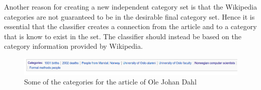 Another reason for creating a new independent category set is that the Wikipedia categories are not guaranteed to be in the desirable final category set. Hence it is essential that the classifier creates a connection from the article and to a category that is know to exist in the set. The classifier should instead be based on the category information provided by Wikipedia. 



\begin{figure}[H]
\centering
\includegraphics[width=\textwidth]{Dumps/imgs/olejohandahl-categories.png}
\caption[Categories for an Wikipedia article]{Some of the categories for the article of Ole Johan Dahl}
\label{fig: olejohandahl_categories}
\end{figure}


